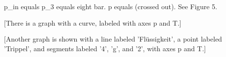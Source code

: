 p_in equals p_3 equals eight bar.  
p equals (crossed out).  
See Figure 5.

[There is a graph with a curve, labeled with axes p and T.]

[Another graph is shown with a line labeled 'Flüssigkeit', a point labeled 'Trippel', and segments labeled '4', 'g', and '2', with axes p and T.]